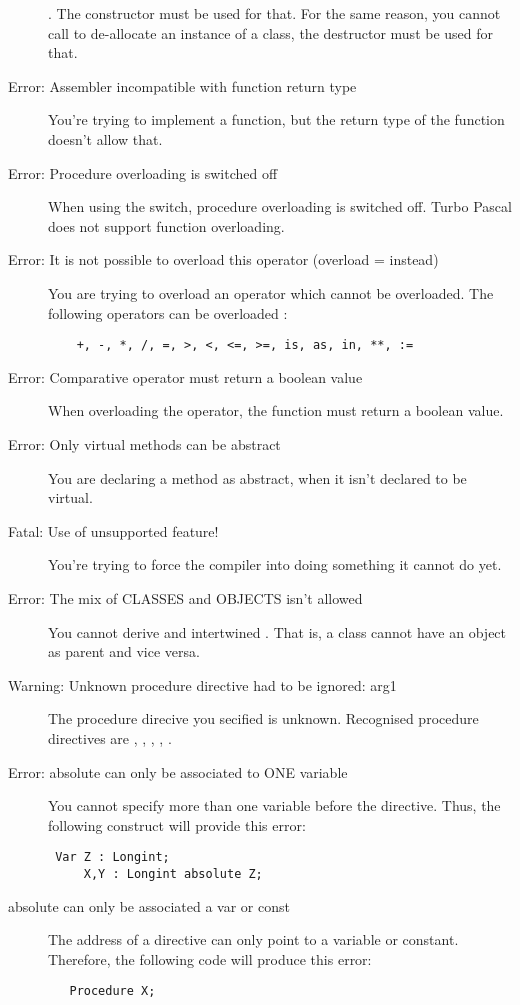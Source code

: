 \begin{description}
 . The constructor must be used for that. For the same reason, you
 cannot call  to de-allocate an instance of a class, the
 destructor must be used for that.
\item [Error: Assembler incompatible with function return type]
 You're trying to implement a  function, but the return type
 of the function doesn't allow that.
\item [Error: Procedure overloading is switched off]
 When using the  switch, procedure overloading is switched off.
 Turbo Pascal does not support function overloading.
\item [Error: It is not possible to overload this operator (overload = instead)]
 You are trying to overload an operator which cannot be overloaded.
 The following operators can be overloaded :
 \begin{verbatim}
    +, -, *, /, =, >, <, <=, >=, is, as, in, **, :=
 \end{verbatim}
\item [Error: Comparative operator must return a boolean value]
 When overloading the \var{=} operator, the function must return a boolean
 value.
\item [Error: Only virtual methods can be abstract]
 You are declaring a method as abstract, when it isn't declared to be
 virtual.
\item [Fatal: Use of unsupported feature!]
 You're trying to force the compiler into doing something it cannot do yet.
\item [Error: The mix of CLASSES and OBJECTS isn't allowed]
 You cannot derive  and  intertwined . That is,
 a class cannot have an object as parent and vice versa.
\item [Warning: Unknown procedure directive had to be ignored: arg1]
 The procedure direcive you secified is unknown. Recognised procedure
 directives are , , , 
 , .
\item [Error: absolute can only be associated to ONE variable]
 You cannot specify more than one variable before the  directive.
 Thus, the following construct will provide this error:
 \begin{verbatim}
 Var Z : Longint;
     X,Y : Longint absolute Z;
 \end{verbatim}
 \item [ absolute can only be associated a var or const ]
 The address of a  directive can only point to a variable or
 constant. Therefore, the following code will produce this error:
 \begin{verbatim}
   Procedure X;


\end{verbatim}
\end{description}
